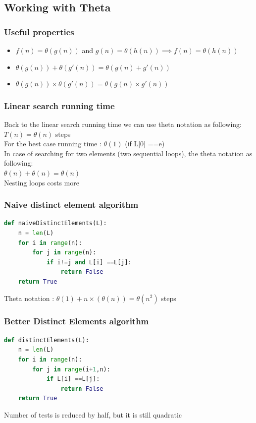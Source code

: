 \documentclass[12pt,oneside]{book}
\begin{document}
\subsection{Working with Theta}
\subsubsection{Useful properties}
\begin{itemize}
	\item $f(n) = \theta(g(n))$ and $g(n) = \theta(h(n)) \implies f(n) = \theta(h(n))$
	\item $\theta(g(n)) + \theta(g'(n)) = \theta(g(n) + g'(n))$
	\item $\theta(g(n)) \times \theta(g'(n)) = \theta(g(n)\times g'(n))$
\end{itemize}
\subsubsection{Linear search running time}
Back to the linear search running time we can use theta notation as following: $T(n) = \theta(n)$ steps\\
For the best case running time : $\theta(1)$ (if L[0] ==e)\\
In case of searching for two elements (two sequential loops), the theta notation as following:\\
$\theta(n) + \theta(n) = \theta(n)$\\
Nesting loops costs more
\subsubsection{Naive distinct element algorithm}
{\small\begin{lstlisting}[language=python]
def naiveDistinctElements(L):
	n = len(L)
	for i in range(n):
		for j in range(n):
			if i!=j and L[i] ==L[j]:
				return False 
	return True 
\end{lstlisting}}
Theta notation : $\theta(1) + n\times(\theta(n)) = \theta(n^2)$ steps
\subsubsection{Better Distinct Elements algorithm}
{\small\begin{lstlisting}[language=python]
def distinctElements(L):    
	n = len(L)
	for i in range(n):
		for j in range(i+1,n):
			if L[i] ==L[j]:
				return False 
	return True
\end{lstlisting}}
Number of tests is reduced by half, but it is still quadratic
\end{document}
